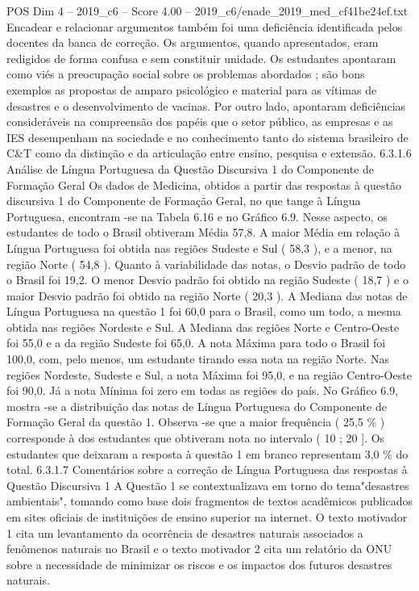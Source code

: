 \begin{textsample}{POS Dim 4 – 2019\_c6 – Score 4.00 – 2019\_c6/enade\_2019\_med\_cf41be24ef.txt}
Encadear e relacionar argumentos também foi uma deficiência identificada pelos docentes da banca de correção.
Os argumentos, quando apresentados, eram redigidos de forma confusa e sem constituir unidade.
Os estudantes apontaram como viés a preocupação social sobre os problemas abordados ; são bons exemplos as propostas de amparo psicológico e material para as vítimas de desastres e o desenvolvimento de vacinas.
Por outro lado, apontaram deficiências consideráveis na compreensão dos papéis que o setor público, as empresas e as IES desempenham na sociedade e no conhecimento tanto do sistema brasileiro de C\&T como da distinção e da articulação entre ensino, pesquisa e extensão. 6.3.1.6 Análise de Língua Portuguesa da Questão Discursiva 1 do Componente de Formação Geral Os dados de Medicina, obtidos a partir das respostas à questão discursiva 1 do Componente de Formação Geral, no que tange à Língua Portuguesa, encontram -se na Tabela 6.16 e no Gráfico 6.9.
Nesse aspecto, os estudantes de todo o Brasil obtiveram Média 57,8.
A maior Média em relação à Língua Portuguesa foi obtida nas regiões Sudeste e Sul ( 58,3 ), e a menor, na região Norte ( 54,8 ).
Quanto à variabilidade das notas, o Desvio padrão de todo o Brasil foi 19,2.
O menor Desvio padrão foi obtido na região Sudeste ( 18,7 ) e o maior Desvio padrão foi obtido na região Norte ( 20,3 ).
A Mediana das notas de Língua Portuguesa na questão 1 foi 60,0 para o Brasil, como um todo, a mesma obtida nas regiões Nordeste e Sul.
A Mediana das regiões Norte e Centro-Oeste foi 55,0 e a da região Sudeste foi 65,0.
A nota Máxima para todo o Brasil foi 100,0, com, pelo menos, um estudante tirando essa nota na região Norte.
Nas regiões Nordeste, Sudeste e Sul, a nota Máxima foi 95,0, e na região Centro-Oeste foi 90,0.
Já a nota Mínima foi zero em todas as regiões do país.
No Gráfico 6.9, mostra -se a distribuição das notas de Língua Portuguesa do Componente de Formação Geral da questão 1.
Observa -se que a maior frequência ( 25,5 \% ) corresponde à dos estudantes que obtiveram nota no intervalo ( 10 ; 20 ].
Os estudantes que deixaram a resposta à questão 1 em branco representam 3,0 \% do total. 6.3.1.7 Comentários sobre a correção de Língua Portuguesa das respostas à Questão Discursiva 1 A Questão 1 se contextualizava em torno do tema"desastres ambientais", tomando como base dois fragmentos de textos acadêmicos publicados em sites oficiais de instituições de ensino superior na internet.
O texto motivador 1 cita um levantamento da ocorrência de desastres naturais associados a fenômenos naturais no Brasil e o texto motivador 2 cita um relatório da ONU sobre a necessidade de minimizar os riscos e os impactos dos futuros desastres naturais.

\end{textsample}
